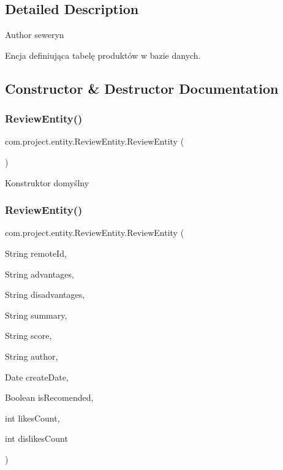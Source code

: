 \subsection{Detailed Description}
\begin{DoxyAuthor}{Author}
seweryn
\end{DoxyAuthor}
Encja definiująca tabelę produktów w bazie danych. 

\subsection{Constructor \& Destructor Documentation}
\mbox{\label{classcom_1_1project_1_1entity_1_1_review_entity_aa6e9799a82a57959832038606fa3f8d0}} 
\subsubsection{Review\+Entity()\hspace{0.1cm}{\footnotesize\ttfamily [1/2]}}
{\footnotesize\ttfamily com.\+project.\+entity.\+Review\+Entity.\+Review\+Entity (\begin{DoxyParamCaption}{ }\end{DoxyParamCaption})}

Konstruktor domyślny \mbox{\label{classcom_1_1project_1_1entity_1_1_review_entity_a2252f104aeda2d5b7c0d39b72490984e}} 
\subsubsection{Review\+Entity()\hspace{0.1cm}{\footnotesize\ttfamily [2/2]}}
{\footnotesize\ttfamily com.\+project.\+entity.\+Review\+Entity.\+Review\+Entity (\begin{DoxyParamCaption}\item[{String}]{remote\+Id,  }\item[{String}]{advantages,  }\item[{String}]{disadvantages,  }\item[{String}]{summary,  }\item[{String}]{score,  }\item[{String}]{author,  }\item[{Date}]{create\+Date,  }\item[{Boolean}]{is\+Recomended,  }\item[{int}]{likes\+Count,  }\item[{int}]{dislikes\+Count }\end{DoxyParamCaption})}


